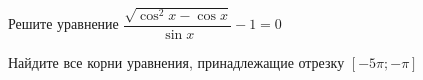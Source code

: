 \begin{ex}
	\begin{condition}
		\begin{enumcols}[label=\asbuk*)]
			\item Решите уравнение \( \dfrac{\sqrt{\cos^2 x -\cos x}}{\sin x}-1 =0 \)
			\item Найдите все корни уравнения, принадлежащие отрезку \( \left[-5\pi;-\pi\right] \)
		\end{enumcols}
	\end{condition}
\end{ex}